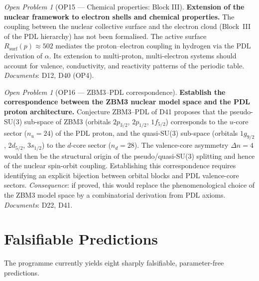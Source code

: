 \documentclass[11pt,a4paper]{article}
\theoremstyle{plain}
\theoremstyle{definition}
\theoremstyle{remark}
\newtheorem{openproblem}[theorem]{Open Problem}
\newcommand{\Rsurf}{R_{\mathrm{surf}}}
\begin{document}
\begin{openproblem}[OP15 — Chemical properties: Block III]
\label{op:chemistry}
\textbf{Extension of the nuclear framework to electron shells and chemical properties.}
The coupling between the nuclear collective surface and the electron cloud (Block~III of the PDL hierarchy) has not been formalised.
The active surface $\Rsurf(p) \approx 502$ mediates the proton--electron coupling in hydrogen via the PDL derivation of $\alpha$.
Its extension to multi-proton, multi-electron systems should account for valence, conductivity, and reactivity patterns of the periodic table.
\emph{Documents}: D12, D40 (OP4).
\end{openproblem}

\begin{openproblem}[OP16 — ZBM3--PDL correspondence]
\label{op:ZBM3}
\textbf{Establish the correspondence between the ZBM3 nuclear model space and the PDL proton architecture.}
Conjecture ZBM3--PDL of D41 proposes that the pseudo-SU(3) sub-space of ZBM3 (orbitals $2p_{3/2}$, $2p_{1/2}$, $1f_{5/2}$) corresponds to the $u$-core sector ($n_u=24$) of the PDL proton, and the quasi-SU(3) sub-space (orbitals $1g_{9/2}$, $2d_{5/2}$, $3s_{1/2}$) to the $d$-core sector ($n_d=28$).
The valence-core asymmetry $\Delta n = 4$ would then be the structural origin of the pseudo/quasi-SU(3) splitting and hence of the nuclear spin-orbit coupling.
Establishing this correspondence requires identifying an explicit bijection between orbital blocks and PDL valence-core sectors.
\emph{Consequence}: if proved, this would replace the phenomenological choice of the ZBM3 model space by a combinatorial derivation from PDL axioms.
\emph{Documents}: D22, D41.
\end{openproblem}

\section{Falsifiable Predictions}
\label{sec:predictions}

The programme currently yields eight sharply falsifiable, parameter-free predictions.
\end{document}
